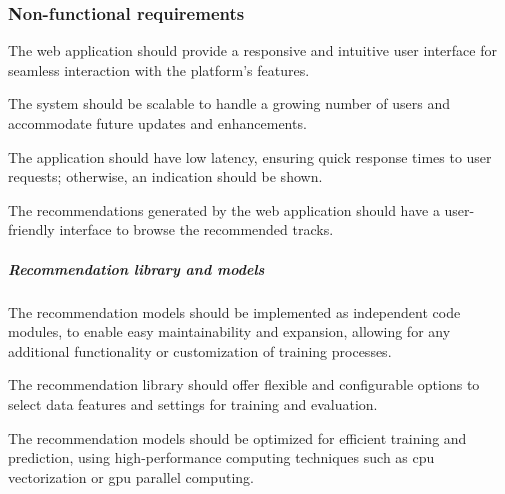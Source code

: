 \subsubsection{Non-functional requirements}
\begin{nonfunctionalmod}[WA]
    \item The web application should provide a responsive and intuitive user interface for seamless interaction with the platform's features.
    \item The system should be scalable to handle a growing number of users and accommodate future updates and enhancements.
    \item The application should have low latency, ensuring quick response times to user requests; otherwise, an indication should be shown.
    \item The recommendations generated by the web application should have a user-friendly interface to browse the recommended tracks.
    \setcounter{WANF}{\value{enumi}}
\end{nonfunctionalmod}
\subparagraph{Recommendation library and models}
\begin{nonfunctionalmod}[WA]
    \setcounter{enumi}{\value{WANF}}
    \item The recommendation models should be implemented as independent code modules, to enable easy maintainability and expansion, allowing for any additional functionality or customization of training processes.
    \item The recommendation library should offer flexible and configurable options to select data features and settings for training and evaluation.
    \item The recommendation models should be optimized for efficient training and prediction, using high-performance computing techniques such as \acs{cpu} vectorization or \acs{gpu} parallel computing.
\end{nonfunctionalmod}